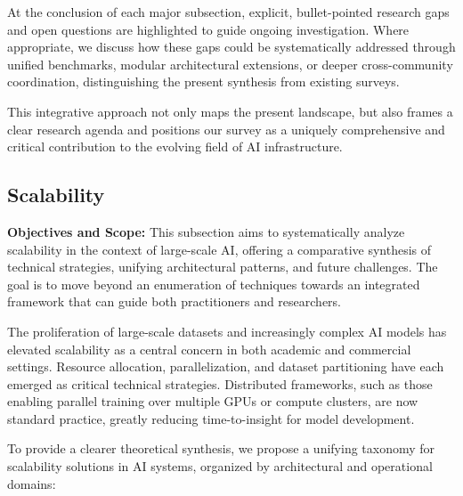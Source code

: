 \documentclass[sigconf]{acmart}
\begin{document}
At the conclusion of each major subsection, explicit, bullet-pointed research gaps and open questions are highlighted to guide ongoing investigation. Where appropriate, we discuss how these gaps could be systematically addressed through unified benchmarks, modular architectural extensions, or deeper cross-community coordination, distinguishing the present synthesis from existing surveys. 

This integrative approach not only maps the present landscape, but also frames a clear research agenda and positions our survey as a uniquely comprehensive and critical contribution to the evolving field of AI infrastructure.

\subsection{Scalability}
\textbf{Objectives and Scope:} This subsection aims to systematically analyze scalability in the context of large-scale AI, offering a comparative synthesis of technical strategies, unifying architectural patterns, and future challenges. The goal is to move beyond an enumeration of techniques towards an integrated framework that can guide both practitioners and researchers.

The proliferation of large-scale datasets and increasingly complex AI models has elevated scalability as a central concern in both academic and commercial settings. Resource allocation, parallelization, and dataset partitioning have each emerged as critical technical strategies. Distributed frameworks, such as those enabling parallel training over multiple GPUs or compute clusters, are now standard practice, greatly reducing time-to-insight for model development.

To provide a clearer theoretical synthesis, we propose a unifying taxonomy for scalability solutions in AI systems, organized by architectural and operational domains:
\end{document}

